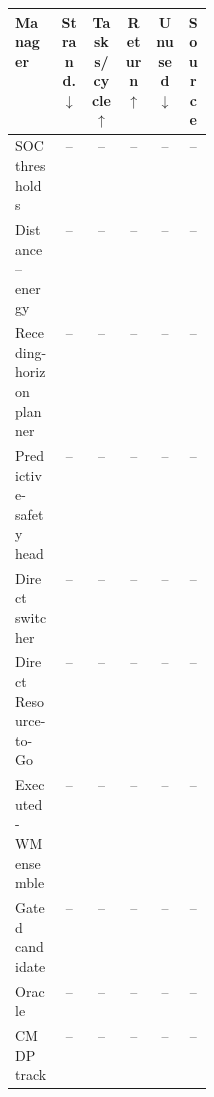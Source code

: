 \begin{center}
\centering
\small
{}
\begin{tabular}{p{0.23\linewidth}ccccc}
\toprule
Manager & Strand.$\downarrow$ & Tasks/cycle$\uparrow$ & Return$\uparrow$ & Unused$\downarrow$ & Source \\
\midrule
SOC thresholds & -- & -- & -- & -- & -- \\
Distance--energy & -- & -- & -- & -- & -- \\
Receding-horizon planner & -- & -- & -- & -- & -- \\
Predictive-safety head & -- & -- & -- & -- & -- \\
Direct switcher & -- & -- & -- & -- & -- \\
Direct Resource-to-Go & -- & -- & -- & -- & -- \\
Executed-WM ensemble & -- & -- & -- & -- & -- \\
Gated candidate & -- & -- & -- & -- & -- \\
Oracle & -- & -- & -- & -- & -- \\
CMDP track & -- & -- & -- & -- & -- \\
\bottomrule
\end{tabular}
\end{center}
